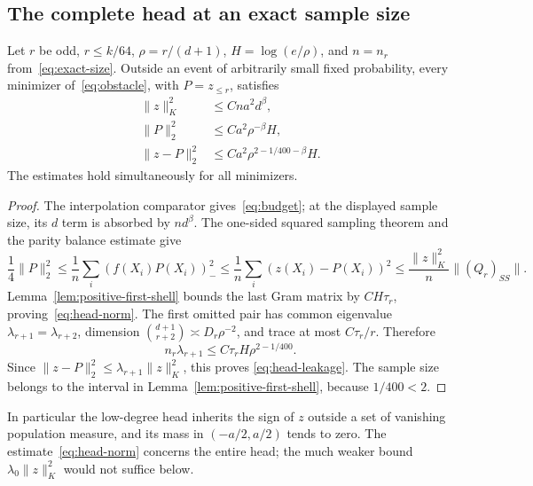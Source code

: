 \subsection{The complete head at an exact sample size}
\begin{proposition}\label{prop:head}
Let $r$ be odd, $r\le k/64$, $\rho=r/(d+1)$,
$H=\log(e/\rho)$, and $n=n_r$ from~\eqref{eq:exact-size}.
Outside an event of arbitrarily small fixed probability, every minimizer
of~\eqref{eq:obstacle}, with $P=z_{\le r}$, satisfies
\begin{align}
 \|z\|_K^2&\le C n a^2d^\beta,\label{eq:budget}\\
 \|P\|_2^2&\le C a^2\rho^{-\beta}H,\label{eq:head-norm}\\
 \|z-P\|_2^2&\le C a^2\rho^{2-1/400-\beta}H.
 \label{eq:head-leakage}
\end{align}
The estimates hold simultaneously for all minimizers.
\end{proposition}
\begin{proof}
The interpolation comparator gives~\eqref{eq:budget}; at the displayed
sample size, its $d$ term is absorbed by $nd^\beta$.
The one-sided squared sampling theorem and the parity balance estimate
give
\[
 \frac14\|P\|_2^2\le\frac1n\sum_i(f(X_i)P(X_i))_-^2
 \le\frac1n\sum_i(z(X_i)-P(X_i))^2
 \le\frac{\|z\|_K^2}{n}\|(Q_r)_{SS}\|.
\]
Lemma~\ref{lem:positive-first-shell} bounds the last Gram matrix by
$CH\tau_r$, proving~\eqref{eq:head-norm}.
The first omitted pair has common eigenvalue
$\lambda_{r+1}=\lambda_{r+2}$, dimension
$\binom{d+1}{r+2}\asymp D_r\rho^{-2}$, and trace at most
$C\tau_r/r$. Therefore
\[
 n_r\lambda_{r+1}\le C\tau_r H\rho^{2-1/400}.
\]
Since $\|z-P\|_2^2\le\lambda_{r+1}\|z\|_K^2$, this proves
\eqref{eq:head-leakage}. The sample size belongs to the interval in
Lemma~\ref{lem:positive-first-shell}, because $1/400<2$.
\end{proof}

In particular the low-degree head inherits the sign of $z$ outside a
set of vanishing population measure, and its mass in $(-a/2,a/2)$ tends
to zero. The estimate~\eqref{eq:head-norm} concerns the entire head;
the much weaker bound $\lambda_0\|z\|_K^2$ would not suffice below.
